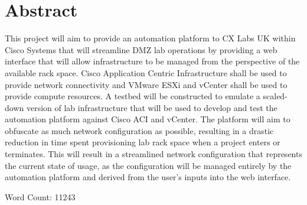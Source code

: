 \section*{Abstract}
This project will aim to provide an automation platform to CX Labs UK within Cisco Systems that will streamline DMZ lab operations by providing a web interface that will allow infrastructure to be managed from the perspective of the available rack space. Cisco Application Centric Infrastructure shall be used to provide network connectivity and VMware ESXi and vCenter shall be used to provide compute resources. A testbed will be constructed to emulate a scaled-down version of lab infrastructure that will be used to develop and test the automation platform against Cisco ACI and vCenter. The platform will aim to obfuscate as much network configuration as possible, resulting in a drastic reduction in time spent provisioning lab rack space when a project enters or terminates. This will result in a streamlined network configuration that represents the current state of usage, as the configuration will be managed entirely by the automation platform and derived from the user's inputs into the web interface.



Word Count: 11243